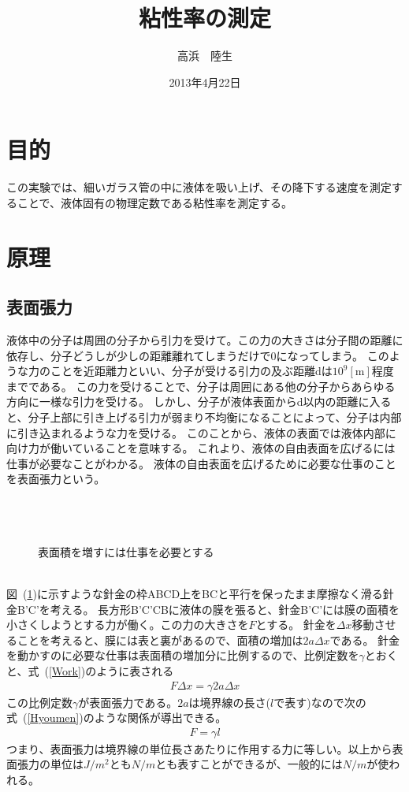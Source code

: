 \documentclass[a4j,10pt]{jarticle}
\title{粘性率の測定}
\author{高浜　陸生}
\date{2013年4月22日}
\newcommand{\Equref}[1]{式~(\ref{#1})}
\newcommand{\Figref}[1]{図~(\ref{#1})}
\begin{document}
\section{目的}
この実験では、細いガラス管の中に液体を吸い上げ、その降下する速度を測定することで、液体固有の物理定数である粘性率を測定する。
\section{原理}
\subsection{表面張力}
液体中の分子は周囲の分子から引力を受けて。この力の大きさは分子間の距離に依存し、分子どうしが少しの距離離れてしまうだけで0になってしまう。
このような力のことを近距離力といい、分子が受ける引力の及ぶ距離dは$10^{9}[\mathrm m]$程度までである。
この力を受けることで、分子は周囲にある他の分子からあらゆる方向に一様な引力を受ける。
しかし、分子が液体表面からd以内の距離に入ると、分子上部に引き上げる引力が弱まり不均衡になることによって、分子は内部に引き込まれるような力を受ける。
このことから、液体の表面では液体内部に向け力が働いていることを意味する。
これより、液体の自由表面を広げるには仕事が必要なことがわかる。
液体の自由表面を広げるために必要な仕事のことを表面張力という。
\\ \\ \\ \\
\begin{figure}[h]
\caption{表面積を増すには仕事を必要とする}
\label{Fig:Harigane}
\end{figure}
\\
\Figref{Fig:Harigane}に示すような針金の枠ABCD上をBCと平行を保ったまま摩擦なく滑る針金B'C'を考える。
長方形B'C'CBに液体の膜を張ると、針金B'C'には膜の面積を小さくしようとする力が働く。この力の大きさを$F$とする。
針金を$\Delta x$移動させることを考えると、膜には表と裏があるので、面積の増加は$2a\Delta x$である。
針金を動かすのに必要な仕事は表面積の増加分に比例するので、比例定数を$\gamma$とおくと、\Equref{Work}のように表される
\begin{eqnarray}
\label{Work}
F\Delta x = \gamma 2a\Delta x
\end{eqnarray}
この比例定数$\gamma$が表面張力である。$2a$は境界線の長さ($l$で表す)なので次の\Equref{Hyoumen}のような関係が導出できる。
\begin{eqnarray}
\label{Hyoumen}
F=\gamma l
\end{eqnarray}
つまり、表面張力は境界線の単位長さあたりに作用する力に等しい。以上から表面張力の単位は$J/m^{2}$とも$N/m$とも表すことができるが、一般的には$N/m$が使われる。
\end{document}
